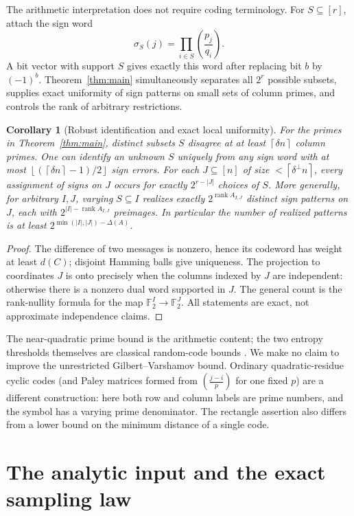 \documentclass[11pt]{article}
\newtheorem{corollary}[theorem]{Corollary}
\theoremstyle{remark}\newtheorem{remark}[theorem]{Remark}
\newcommand{\F}{\mathbb F_2}
\newcommand{\rank}{\operatorname{rank}}
\newcommand{\Leg}[2]{\left(\frac{#1}{#2}\right)}
\newcommand{\floor}[1]{\left\lfloor #1\right\rfloor}
\newcommand{\ceil}[1]{\left\lceil #1\right\rceil}
\begin{document}
The arithmetic interpretation does not require coding terminology. For $S\subseteq[r]$, attach the sign word
\[
 \sigma_S(j)=\prod_{i\in S}\Leg{p_j}{q_i}.
\]
A bit vector with support $S$ gives exactly this word after replacing bit $b$ by $(-1)^b$. Theorem~\ref{thm:main} simultaneously separates all $2^r$ possible subsets, supplies exact uniformity of sign patterns on small sets of column primes, and controls the rank of arbitrary restrictions.
\begin{corollary}[Robust identification and exact local uniformity]\label{cor:arithmetic}
For the primes in Theorem~\ref{thm:main}, distinct subsets $S$ disagree at at least $\ceil{\delta n}$ column primes. One can identify an unknown $S$ uniquely from any sign word with at most $\floor{(\ceil{\delta n}-1)/2}$ sign errors. For each $J\subseteq[n]$ of size $<\ceil{\delta^\perp n}$, every assignment of signs on $J$ occurs for exactly $2^{r-|J|}$ choices of $S$. More generally, for arbitrary $I,J$, varying $S\subseteq I$ realizes exactly $2^{\rank A_{I,J}}$ distinct sign patterns on $J$, each with $2^{|I|-\rank A_{I,J}}$ preimages. In particular the number of realized patterns is at least $2^{\min(|I|,|J|)-\Delta(A)}$.
\end{corollary}
\begin{proof}
The difference of two messages is nonzero, hence its codeword has weight at least $d(C)$; disjoint Hamming balls give uniqueness. The projection to coordinates $J$ is onto precisely when the columns indexed by $J$ are independent: otherwise there is a nonzero dual word supported in $J$. The general count is the rank-nullity formula for the map $\F^I\to\F^J$. All statements are exact, not approximate independence claims.
\end{proof}

The near-quadratic prime bound is the arithmetic content; the two entropy thresholds themselves are classical random-code bounds \cite{gv}. We make no claim to improve the unrestricted Gilbert--Varshamov bound. Ordinary quadratic-residue cyclic codes (and Paley matrices formed from $\Leg{j-i}{p}$ for one fixed $p$) are a different construction: here both row and column labels are prime numbers, and the symbol has a varying prime denominator. The rectangle assertion also differs from a lower bound on the minimum distance of a single code.

\section{The analytic input and the exact sampling law}\label{sec:analytic}
\end{document}
